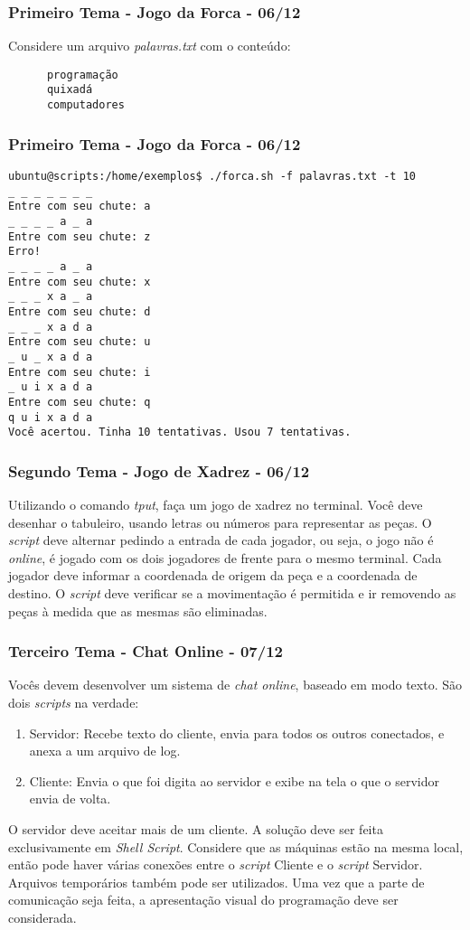 \documentclass{beamer}
\begin{document}
   \begin{frame}[fragile]
      \frametitle{Primeiro Tema - Jogo da Forca - 06/12}
      Considere um arquivo \textit{palavras.txt} com o conteúdo:
      \begin{verbatim}
      programação
      quixadá
      computadores
      \end{verbatim}
\end{frame}

   \begin{frame}[fragile]
      \frametitle{Primeiro Tema - Jogo da Forca - 06/12}
      \scriptsize
      \begin{verbatim}
ubuntu@scripts:/home/exemplos$ ./forca.sh -f palavras.txt -t 10
_ _ _ _ _ _ _
Entre com seu chute: a
_ _ _ _ a _ a
Entre com seu chute: z
Erro!
_ _ _ _ a _ a
Entre com seu chute: x
_ _ _ x a _ a
Entre com seu chute: d
_ _ _ x a d a
Entre com seu chute: u
_ u _ x a d a
Entre com seu chute: i
_ u i x a d a
Entre com seu chute: q
q u i x a d a
Você acertou. Tinha 10 tentativas. Usou 7 tentativas.
      \end{verbatim}
\end{frame}

   \begin{frame}
      \frametitle{Segundo Tema - Jogo de Xadrez - 06/12}
	Utilizando o comando \textit{tput}, faça um jogo de xadrez no terminal. Você deve desenhar o tabuleiro, usando letras ou números para representar as peças. O \textit{script} deve alternar pedindo a entrada de cada jogador, ou seja, o jogo não é \textit{online}, é jogado com os dois jogadores de frente para o mesmo terminal. Cada jogador deve informar a coordenada de origem da peça e a coordenada de destino. O \textit{script} deve verificar se a movimentação é permitida e ir removendo as peças à medida que as mesmas são eliminadas. 
   \end{frame}

   \begin{frame}
      \frametitle{Terceiro Tema - Chat Online - 07/12}
      Vocês devem desenvolver um sistema de \textit{chat online}, baseado em modo texto. São dois \textit{scripts} na verdade:
      \begin{enumerate}
         \item Servidor: Recebe texto do cliente, envia para todos os outros conectados, e anexa a um arquivo de log.
         \item Cliente: Envia o que foi digita ao servidor e exibe na tela o que o servidor envia de volta.
      \end{enumerate}
      O servidor deve aceitar mais de um cliente. A solução deve ser feita exclusivamente em \textit{Shell Script}. Considere que as máquinas estão na mesma local, então pode haver várias conexões entre o \textit{script} Cliente e o \textit{script} Servidor. Arquivos temporários também pode ser utilizados. Uma vez que a parte de comunicação seja feita, a apresentação visual do programação deve ser considerada. 
   \end{frame}
\end{document}
